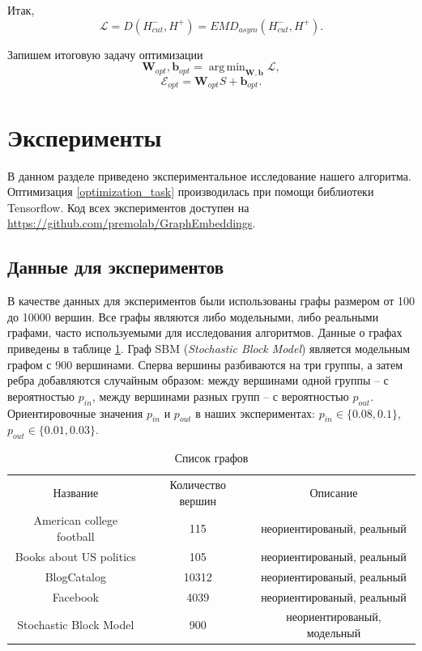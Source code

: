 \documentclass[12pt,a4paper]{extarticle}
\newcommand{\E}{\mathcal{E}}
\newcommand{\W}{\textbf{W}}
\newcommand{\Loss}{\mathcal{L}}
\DeclareMathOperator*{\argmin}{arg\,min}
\begin{document}
    Итак, 
    \begin{equation}
        \Loss = D(H^-_{cut}, H^+) = EMD_{asym}(H^-_{cut}, H^+).
    \end{equation}
    
    Запишем итоговую задачу оптимизации
    \begin{equation} \label{optimization_task}
    \W_{opt}, \mathbf{b}_{opt} = \argmin_{\W, \mathbf{b}} \Loss,
    \end{equation}
    \[\E_{opt} = \W_{opt} S + \mathbf{b}_{opt}.\]
    
    
    \section{Эксперименты}
    В данном разделе приведено экспериментальное исследование нашего алгоритма. Оптимизация \eqref{optimization_task} производилась при помощи библиотеки Tensorflow.
    Код всех экспериментов доступен на \url{https://github.com/premolab/GraphEmbeddings}.
    
    \subsection{Данные для экспериментов}
    
    В качестве данных для экспериментов были использованы графы размером от 100 до 10000 вершин.
    Все графы являются либо модельными, либо реальными графами, часто используемыми для исследования алгоритмов. Данные о графах приведены в таблице \ref{table_graphs}.
    Граф SBM (\textit{Stochastic Block Model}) является модельным графом с 900 вершинами. Сперва вершины разбиваются на три группы, а затем ребра добавляются случайным образом: между вершинами одной группы -- с вероятностью $p_{in}$, между вершинами разных групп -- с вероятностью $p_{out}$. Ориентировочные значения $p_{in}$ и $p_{out}$ в наших экспериментах: $p_{in} \in \{0.08, 0.1\}$, $p_{out} \in \{0.01, 0.03\}$.
    
    \begin{table}
    \begin{center}
    \begin{tabular}{ccc}
    	Название & Количество вершин & Описание\\
        \noalign{\smallskip}
        \hline
        \noalign{\smallskip}
        American college football & 115 & неориентированый, реальный \\
        Books about US politics & 105 & неориентированый, реальный \\
        BlogCatalog & 10312 & неориентированый, реальный \\
        Facebook & 4039 & неориентированый, реальный \\
        Stochastic Block Model & 900 & неориентированый, модельный
    \end{tabular}
    \end{center}
    \caption{Список графов} \label{table_graphs}
    \end{table}
    
\end{document}
